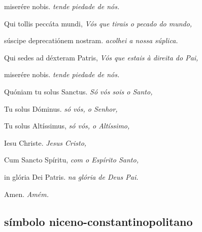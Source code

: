\begin{paracol}{2}
  miserére nobis.
  \switchcolumn
  \emph{tende piedade de nós.}
  \switchcolumn*

  Qui tollis peccáta mundi,
  \switchcolumn
  \emph{Vós que tirais o pecado do mundo,}
  \switchcolumn*

  súscipe deprecatiónem nostram.
  \switchcolumn
  \emph{acolhei a nossa súplica.}
  \switchcolumn*

  Qui sedes ad déxteram Patris,
  \switchcolumn
  \emph{Vós que estais à direita do Pai,}
  \switchcolumn*

  miserére nobis.
  \switchcolumn
  \emph{tende piedade de nós.}
  \switchcolumn*

  Quóniam tu solus Sanctus.
  \switchcolumn
  \emph{Só vós sois o Santo,}
  \switchcolumn*

  Tu solus Dóminus.
  \switchcolumn
  \emph{só vós, o Senhor,}
  \switchcolumn*

  Tu solus Altíssimus,
  \switchcolumn
  \emph{só vós, o Altíssimo,}
  \switchcolumn*

  Iesu Christe.
  \switchcolumn
  \emph{Jesus Cristo,}
  \switchcolumn*

  Cum Sancto Spíritu,
  \switchcolumn
  \emph{com o Espírito Santo,}
  \switchcolumn*

  in glória Dei Patris.
  \switchcolumn
  \emph{na glória de Deus Pai.}
  \switchcolumn*

  Amen.
  \switchcolumn
  \emph{Amém.}
\end{paracol}


\subsection{símbolo niceno-constantinopolitano}

